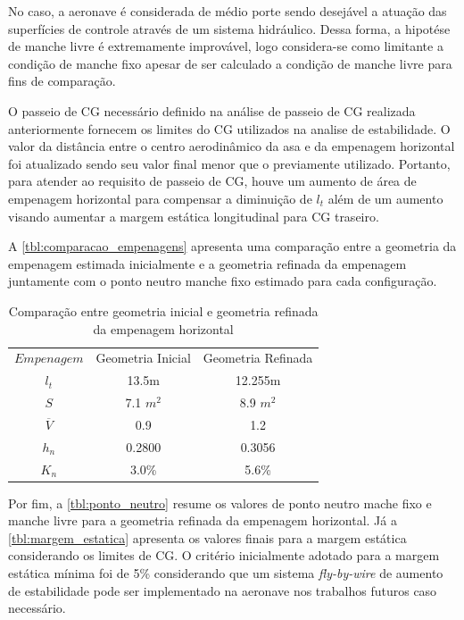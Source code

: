 No caso, a aeronave é considerada de médio porte sendo desejável a atuação das superfícies de controle através de um sistema hidráulico. Dessa forma, a hipotése de manche livre é extremamente improvável, logo considera-se como limitante a condição de manche fixo apesar de ser calculado a condição de manche livre para fins de comparação.

O passeio de CG necessário definido na análise de passeio de CG realizada anteriormente fornecem os limites do CG utilizados na analise de estabilidade. O valor da distância entre o centro aerodinâmico da asa e da empenagem horizontal foi atualizado sendo seu valor final menor que o previamente utilizado. Portanto, para atender ao requisito de passeio de CG, houve um aumento de área de empenagem horizontal para compensar a diminuição de $l_t$ além de um aumento visando aumentar a margem estática longitudinal para CG traseiro.

A \autoref{tbl:comparacao_empenagens} apresenta uma comparação entre a geometria da empenagem estimada inicialmente e a geometria refinada da empenagem juntamente com o ponto neutro manche fixo estimado para cada configuração.

\begin{table}[H]
\centering
\begin{tabular}{ccc}
\toprule
$ Empenagem $ & Geometria Inicial & Geometria Refinada \\
$ l_t $ & 13.5m & 12.255m \\
$ S $ & 7.1 $m^2$ & 8.9 $m^2$ \\
$ \overline{V} $ & 0.9 & 1.2 \\
$ h_n $ & 0.2800 & 0.3056 \\
$ K_n $ & 3.0\% & 5.6\% \\
\bottomrule
\end{tabular}
\caption[Comparação entre geometria inicial e geometria refinada da empenagem horizontal]{Comparação entre geometria inicial e geometria refinada da empenagem horizontal}
\label{tbl:comparacao_empenagens}
\end{table}

Por fim, a \autoref{tbl:ponto_neutro} resume os valores de ponto neutro mache fixo e manche livre para a geometria refinada da empenagem horizontal. Já a \autoref{tbl:margem_estatica} apresenta os valores finais para a margem estática considerando os limites de CG. O critério inicialmente adotado para a margem estática mínima foi de 5\% considerando que um sistema \textit{fly-by-wire} de aumento de estabilidade pode ser implementado na aeronave nos trabalhos futuros caso necessário.

